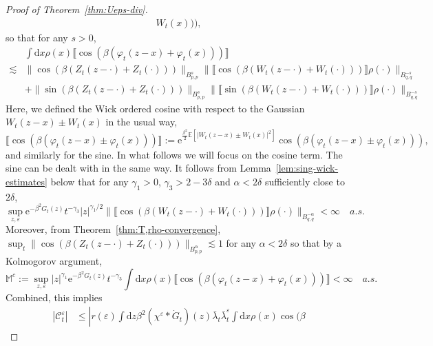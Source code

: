 \documentclass[11pt, a4paper]{scrartcl}
\numberwithin{equation}{section}
\theoremstyle{plain}
\theoremstyle{remark}
\newcommand{\assign}{:=}
\newcommand{\mathd}{\mathrm{d}}
\newcommand{\mathe}{\mathrm{e}}
\begin{document}
\begin{proof}[Proof of Theorem~\ref{thm:Ueps-div}]
\[\begin{aligned}
       W_t (x))),
     \end{aligned} \]
  so that for any $s > 0$,
  \[ \begin{aligned}
       & \int \mathd x \rho (x) \llbracket \cos (\beta (\varphi_t (z - x) +
       \varphi_t (x))) \rrbracket\\
       \lesssim & \| \cos (\beta (Z_t (z - \cdot) + Z_t (\cdot))) \|_{B^s_{p,
       p}}  \| \llbracket \cos (\beta (W_t (z - \cdot) + W_t (\cdot)))
       \rrbracket \rho (\cdot) \|_{B^{- s}_{q, q}}\\ 
       &+ \| \sin (\beta (Z_t (z - \cdot) + Z_t (\cdot))) \|_{B^s_{p,
       p}}  \| \llbracket \sin (\beta (W_t (z - \cdot) + W_t (\cdot)))
       \rrbracket \rho (\cdot) \|_{B^{- s}_{q, q}} 
     \end{aligned} \]
  Here, we defined the Wick ordered cosine with respect to the Gaussian $W_t
  (z - x) \pm W_t (x)$ in the usual way,
  \begin{equation}
    \llbracket \cos (\beta (\varphi_t (z - x) \pm \varphi_t (x))) \rrbracket
    \assign \mathe^{\frac{\beta^2}{2} \mathbb{E} [| W_t (z - x) \pm W_t (x)
    |^2]} \cos (\beta (\varphi_t (z - x) \pm \varphi_t (x))),
    \label{eq:def-Wick-sum}
  \end{equation}
  and similarly for the sine. In what follows we will focus on the cosine term. 
  The sine can be dealt with in the same way.
  It follows from Lemma~\ref{lem:sing-wick-estimates} below that for any
  $\gamma_1 > 0$, $\gamma_3 > 2 - 3 \delta$ and $\alpha < 2 \delta$ sufficiently
  close to $2 \delta$,
  \[ \sup_{z, \varepsilon} \mathe^{- \beta^2 G_t (z)} t^{- \gamma_3}  | z
     |^{\gamma_1 / 2} \| \llbracket \cos (\beta (W_t (z - \cdot) + W_t
     (\cdot))) \rrbracket \rho (\cdot) \|_{B^{-\alpha}_{q, q}} < \infty \quad a.s.
  \]
  Moreover, from Theorem~\ref{thm:T,rho-convergence}, $\sup_t \| \cos (\beta
  (Z_t (z - \cdot) + Z_t (\cdot))) \|_{B^\alpha_{p, p}} \lesssim 1$ for any $\alpha < 2
  \delta$ so that by a Kolmogorov argument,
  \[ \mathbb{M}^c \assign \sup_{z, \varepsilon} | z |^{\gamma_1} \mathe^{-
     \beta^2 G_t (z)} t^{- \gamma_3}  \int \mathd x \rho (x)  \llbracket \cos
     (\beta (\varphi_t (z - x) + \varphi_t (x))) \rrbracket < \infty \quad
     a.s. \]
  Combined, this implies
  \[ \begin{aligned}
       | \mathcal{C}^{\varepsilon}_t | &\leqslant  \left| r (\varepsilon)
       \int \mathd z \beta^2 (\chi^{\varepsilon} \ast \dot{G}_t ) (z)
       \bar{\lambda}_t \bar{\lambda}_t^{\varepsilon} \int \mathd x \rho (x) \cos (\beta

\end{aligned}\]
\end{proof}
\end{document}
